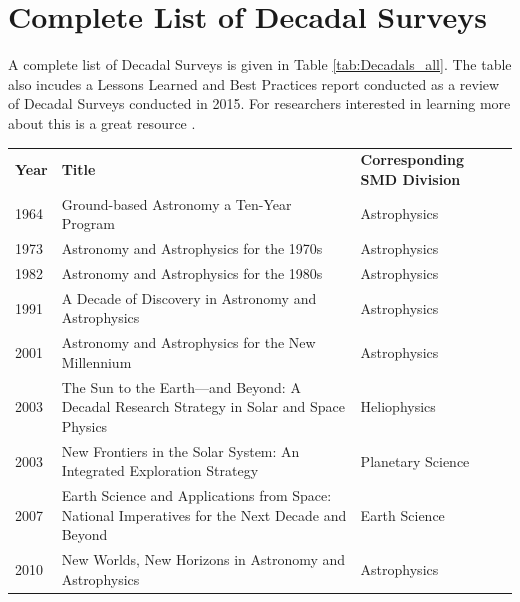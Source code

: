 \documentclass[preprint,12pt,doubleblind]{elsarticle}
\begin{document}
\newpage 
\appendix
\section{Complete List of Decadal Surveys}
\label{app_Decadal_Surveys}
A complete list of Decadal Surveys is given in Table \ref{tab:Decadals_all}. The table also incudes a Lessons Learned and Best Practices report conducted as a review of Decadal Surveys conducted in 2015. For researchers interested in learning more about this is a great resource \cite{Academies2015_lessons}.

\begin{table}[H]
\centering
\begin{tabular}{p{1.2cm} p{8.5cm} p{2.9cm}}
 \hline
 \rowcolor[gray]{0.95}
 \textbf{Year} & \textbf{Title} & \textbf{Corresponding SMD Division} \\

 1964 & Ground-based Astronomy a Ten-Year Program & Astrophysics \\

 1973 & Astronomy and Astrophysics for the 1970s & Astrophysics \\

 1982 & Astronomy and Astrophysics for the 1980s & Astrophysics \\

 1991 & A Decade of Discovery in Astronomy and Astrophysics & Astrophysics \\

 2001 & Astronomy and Astrophysics for the New Millennium & Astrophysics \\

 2003 & The Sun to the Earth—and Beyond: A Decadal Research Strategy in Solar and Space Physics & Heliophysics \\

 2003 & New Frontiers in the Solar System: An Integrated Exploration Strategy & Planetary Science \\

 2007 & Earth Science and Applications from Space: National Imperatives for the Next Decade and Beyond & Earth Science \\

 2010 & New Worlds, New Horizons in Astronomy and Astrophysics & Astrophysics \\


\end{tabular}
\end{table}
\end{document}
